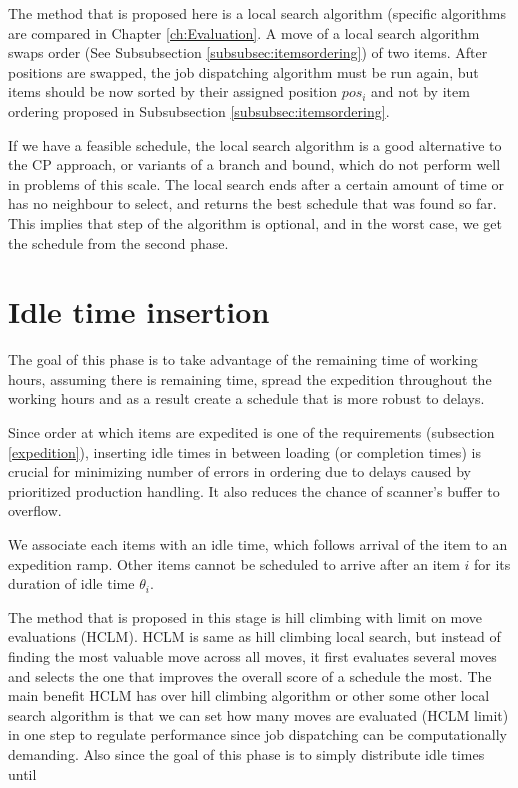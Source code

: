 \documentclass{ctuthesis}
\begin{document}
The method that is proposed here is a local search algorithm (specific algorithms are compared in Chapter \ref{ch:Evaluation}. A move of a local search algorithm swaps order (See Subsubsection \ref{subsubsec:itemsordering}) of two items. After positions are swapped, the job dispatching algorithm must be run again, but items should be now sorted by their assigned position $pos_i$ and not by item ordering proposed in Subsubsection \ref{subsubsec:itemsordering}.

If we have a feasible schedule, the local search algorithm is a good alternative to the CP approach, or variants of a branch and bound, which do not perform well in problems of this scale. The local search ends after a certain amount of time or has no neighbour to select, and returns the best schedule that was found so far. This implies that step of the algorithm is optional, and in the worst case, we get the schedule from the second phase.

\section{Idle time insertion}

The goal of this phase is to take advantage of the remaining time of working hours, assuming there is remaining time, spread the expedition throughout the working hours and as a result create a schedule that is more robust to delays. 

Since order at which items are expedited is one of the requirements (subsection \ref{expedition}), inserting idle times in between loading (or completion times) is crucial for minimizing number of errors in ordering due to delays caused by prioritized production handling. It also reduces the chance of scanner's buffer to overflow.


We associate each items with an idle time, which follows arrival of the item to an expedition ramp. Other items cannot be scheduled to arrive after an item $i$ for its duration of idle time $\theta_i$.

The method that is proposed in this stage is hill climbing with limit on move evaluations (HCLM). HCLM is same as hill climbing local search, but instead of finding the most valuable move across all moves, it first evaluates several moves and selects the one that improves the overall score of a schedule the most. The main benefit HCLM has over hill climbing algorithm or other some other local search algorithm is that we can set how many moves are evaluated (HCLM limit) in one step to regulate performance since job dispatching can be computationally demanding. Also since the goal of this phase is to simply distribute idle times until 
\end{document}

